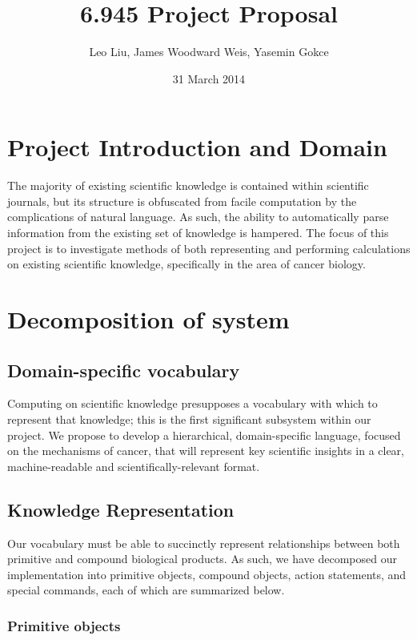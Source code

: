 \documentclass[11pt]{article}
\author{Leo Liu, James Woodward Weis, Yasemin Gokce}
\date{31 March 2014}
\title{6.945 Project Proposal}
\begin{document}
\maketitle
\tableofcontents

\clearpage


\section{Project Introduction and Domain
}
\label{sec-1}


The majority of existing scientific knowledge is contained within scientific journals, but its structure is obfuscated from facile computation by the complications of natural language. As such, the ability to automatically parse information from the existing set of knowledge is  hampered. The focus of this project is to investigate methods of both representing and performing calculations on existing scientific knowledge, specifically in the area of cancer biology.

\section{Decomposition of system
}
\label{sec-2}
\subsection{Domain-specific vocabulary
}
\label{sec-2-1}
Computing on scientific knowledge presupposes a vocabulary with which to represent that knowledge; this is the first significant subsystem within our project. We propose to develop a hierarchical, domain-specific language, focused on the mechanisms of cancer, that will represent key scientific insights in a clear, machine-readable and scientifically-relevant format.

\subsection{Knowledge Representation
}
\label{sec-2-2}


Our  vocabulary must be able to succinctly represent relationships between both primitive and compound biological products. As such, we have decomposed our implementation into primitive objects, compound objects, action statements, and special commands, each of which are summarized below.


\subsubsection{Primitive objects
}
\label{sec-2-2-1}
\end{document}
